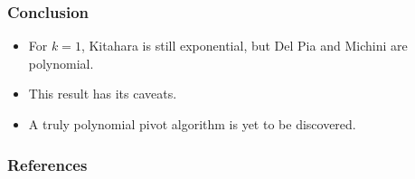 \documentclass{beamer}
\begin{document}
\begin{frame}
	\frametitle{Conclusion}
	\begin{itemize}
		\item For $k=1$, Kitahara is still exponential, but Del Pia and Michini are polynomial.
		\item This result has its caveats.
		\item A truly polynomial pivot algorithm is yet to be discovered.
	\end{itemize}
\end{frame}

\begin{frame}
\frametitle{References}
\printbibliography
\end{frame}

\end{document}
